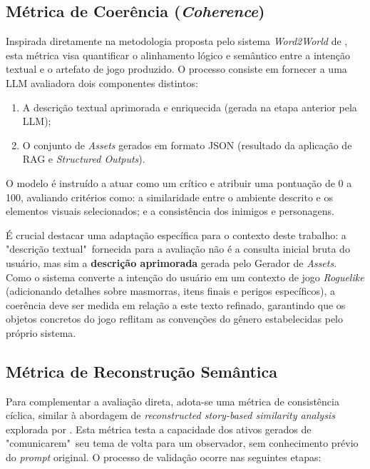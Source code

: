 \subsection{Métrica de Coerência (\textit{Coherence})}

Inspirada diretamente na metodologia proposta pelo sistema \textit{Word2World}
de \citeauthor{nasir2024word2world}, esta métrica visa quantificar o alinhamento
lógico e semântico entre a intenção textual e o artefato de jogo produzido. O
processo consiste em fornecer a uma \gls{LLM} avaliadora dois componentes
distintos:
\begin{enumerate}
    \item A descrição textual aprimorada e enriquecida (gerada na etapa anterior
          pela \gls{LLM});
    \item O conjunto de \textit{Assets} gerados em formato \gls{JSON} (resultado da
          aplicação de \gls{RAG} e \textit{Structured Outputs}).
\end{enumerate}

O modelo é instruído a atuar como um crítico e atribuir uma pontuação de 0 a
100, avaliando critérios como: a similaridade entre o ambiente descrito e os
elementos visuais selecionados; e a consistência dos inimigos e personagens.

É crucial destacar uma adaptação específica para o contexto deste trabalho: a
"descrição textual"\ fornecida para a avaliação não é a consulta inicial bruta do
usuário, mas sim a \textbf{descrição aprimorada} gerada pelo Gerador de
\textit{Assets}. Como o sistema converte a intenção do usuário em um contexto de
jogo \textit{Roguelike} (adicionando detalhes sobre masmorras, itens finais e
perigos específicos), a coerência deve ser medida em relação a este texto
refinado, garantindo que os objetos concretos do jogo reflitam as convenções do
gênero estabelecidas pelo próprio sistema.

\subsection{Métrica de Reconstrução Semântica}

Para complementar a avaliação direta, adota-se uma métrica de consistência
cíclica, similar à abordagem de \textit{reconstructed story-based similarity
    analysis} explorada por \citeauthor{huang2025word2minecraft}. Esta métrica testa
a capacidade dos ativos gerados de "comunicarem"\ seu tema de volta para um
observador, sem conhecimento prévio do \textit{prompt} original. O processo de
validação ocorre nas seguintes etapas:

